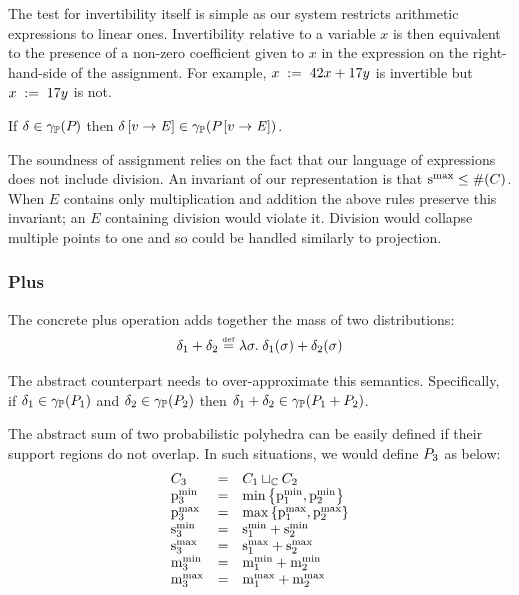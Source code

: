 The test for invertibility itself is simple as our system restricts
arithmetic expressions to linear ones. Invertibility relative to a
variable $ x $ is then equivalent to the presence of a non-zero
coefficient given to $ x $ in the expression on the right-hand-side
of the assignment. For example, $ {x}\;:=\;{42 x + 17y} $ is
invertible but $ {x}\;:=\;{17y} $ is not.

\begin{lemma}
\label{lem:pp:assign}
If $\delta \in \gamma_{\mathbb{P}}(P_{})$ then $\delta \left[ v \rightarrow \mathit{E} \right] \in \gamma_{\mathbb{P}}(P_{} \left[ v \rightarrow \mathit{E} \right])$.
\end{lemma}

The soundness of assignment relies on the fact that our
language of expressions does not include division.  An invariant of
our representation is that $\mathrm{s}^\mathrm{max}_{} \leq \#(C)$.  
When $E$ contains only multiplication and addition the
above rules preserve this invariant; an $E$ containing division would
violate it. 
Division would collapse multiple points to one and so could be handled
similarly to projection.

\subsubsection{Plus}
The concrete plus operation adds together the mass of two
distributions:
$$ \delta_1 + \delta_2 \stackrel{\smash{\scriptscriptstyle \mathrm{def}}}= \lambda \sigma . \; \delta_1(\sigma) +
\delta_2(\sigma) $$

The abstract counterpart needs to 
over-approximate this semantics. Specifically, if $\delta_1 \in
\gamma_{\mathbb{P}}(P_{1})$ and $\delta_2 \in \gamma_{\mathbb{P}}(P_{2})$ then $\delta_1 +
\delta_2 \in \gamma_{\mathbb{P}}(P_{1} + P_{2})$.

The abstract sum of two probabilistic polyhedra can be easily defined
if their support regions do not overlap. In such situations, we would
define $ P_{3} $ as below:
\[\begin{array}{lcl}
C_{3} &=& C_1 \sqcup_{\mathbb{C}} C_2 \\
\mathrm{p}^\mathrm{min}_{3} &=& \min\left\{ \mathrm{p}^\mathrm{min}_{1}, \mathrm{p}^\mathrm{min}_{2} \right\} \\
\mathrm{p}^\mathrm{max}_{3} &=& \max\left\{ \mathrm{p}^\mathrm{max}_{1}, \mathrm{p}^\mathrm{max}_{2} \right\} \\
\mathrm{s}^\mathrm{min}_{3} &=& \mathrm{s}^\mathrm{min}_{1} + \mathrm{s}^\mathrm{min}_{2} \\
\mathrm{s}^\mathrm{max}_{3} &=& \mathrm{s}^\mathrm{max}_{1} + \mathrm{s}^\mathrm{max}_{2} \\
\mathrm{m}^\mathrm{min}_{3} &=& \mathrm{m}^\mathrm{min}_{1} + \mathrm{m}^\mathrm{min}_{2} \\
\mathrm{m}^\mathrm{max}_{3} &=& \mathrm{m}^\mathrm{max}_{1} + \mathrm{m}^\mathrm{max}_{2}
\end{array}\]

